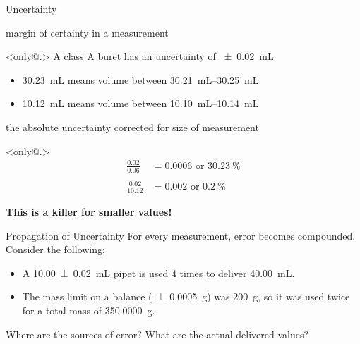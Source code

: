\documentclass[notes=hide]{beamer}
\begin{document}
\begin{frame}[t]{Uncertainty}
	\begin{description}[<+->]
		\item[Absolute uncertainty:] margin of certainty in a
			measurement
			\begin{example}
				A class A buret has an uncertainty of
				\SI{+-0.02}{\mL}
					\begin{itemize}[<1->]
						\item \SI{30.23}{\mL} means
							volume between
							\SIrange{30.21}{30.25}{\mL}
						\item \SI{10.12}{\mL} means
							volume between
							\SIrange{10.10}{10.14}{\mL}
					\end{itemize}
			\end{example}
		\item[Relative uncertainty:] the absolute uncertainty
			corrected for size of measurement
			\begin{example}
				\begin{align*}
					\frac{0.02}{0.06} &= 0.0006 \text{ or }
						\SI{30.23}{\percent} \\ \\
					\frac{0.02}{10.12} &= 0.002 \text{ or }
						\SI{0.2}{\percent}
				\end{align*}

				\bigskip

				\begin{center}
					\bfseries{}
					This is a killer for smaller values!
				\end{center}
			\end{example}
	\end{description}
\end{frame}

\begin{frame}{Propagation of Uncertainty}
	For every measurement, error becomes compounded. Consider the following:
	\begin{itemize}
		\item A \SI{10.00(2)}{\mL} pipet is used 4 times to deliver \SI{40.00}{\mL}.
		\item The mass limit on a balance (\SI{\pm0.0005}{\gram}) was \SI{200}{\gram}, so it was used twice for
			a total mass of \SI{350.0000}{\gram}.
	\end{itemize}

	\bigskip

	Where are the sources of error? What are the actual delivered values?
\end{frame}
\end{document}

